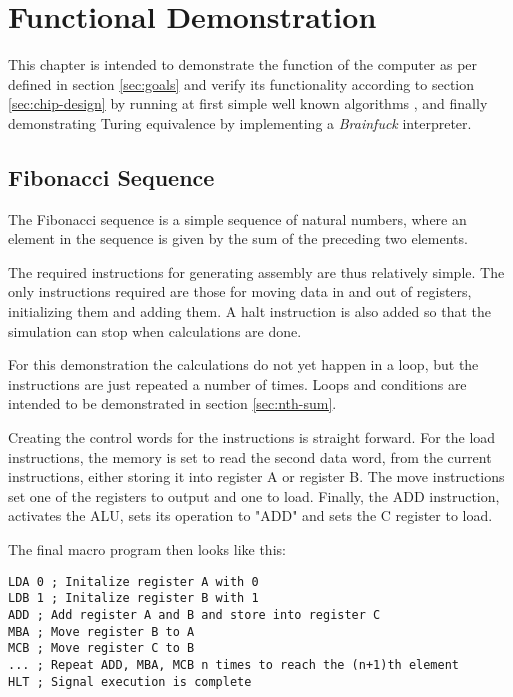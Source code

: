 \chapter{Functional Demonstration} \label{chap:demo}
This chapter is intended to demonstrate the function of the computer as per defined in section \ref{sec:goals} and verify its functionality according to section \ref{sec:chip-design} by running at first simple well known algorithms \cite{chatgptalgoidea}, and finally demonstrating Turing equivalence by implementing a \textit{Brainfuck} interpreter. %

\section{Fibonacci Sequence}
The Fibonacci sequence is a simple sequence of natural numbers, where an element in the sequence is given by the sum of the preceding two elements.

The required instructions for generating assembly are thus relatively simple. The only instructions required are those for moving data in and out of registers, initializing them and adding them. A halt instruction is also added so that the simulation can stop when calculations are done. 

For this demonstration the calculations do not yet happen in a loop, but the instructions are just repeated a number of times. Loops and conditions are intended to be demonstrated in section \ref{sec:nth-sum}.

Creating the control words for the instructions is straight forward. For the load instructions, the memory is set to read the second data word, from the current instructions, either storing it into register A or register B. The move instructions set one of the registers to output and one to load. Finally, the ADD instruction, activates the ALU, sets its operation to "ADD" and sets the C register to load. 

The final macro program then looks like this: 
\begin{lstlisting}[language={[x86masm]Assembler}, caption=Assembly code to calculate the fibonacci series, label=lst:fib]
LDA 0 ; Initalize register A with 0
LDB 1 ; Initalize register B with 1
ADD ; Add register A and B and store into register C
MBA ; Move register B to A
MCB ; Move register C to B
... ; Repeat ADD, MBA, MCB n times to reach the (n+1)th element
HLT ; Signal execution is complete
\end{lstlisting}

